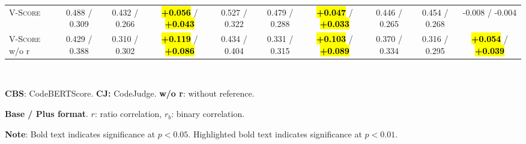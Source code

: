 \begin{table}[t]
\begin{tabular}{@{}
        l|ccc|ccc|ccc@{}}
        \midrule
        \textsc{V-Score}        & 0.488 / 0.309   & 0.432 / 0.266   & \hl{\textbf{+0.056}} / \hl{\textbf{+0.043}} & 0.527 / 0.322   & 0.479 / 0.288   & \hl{\textbf{+0.047}} / \hl{\textbf{+0.033}} & 0.446 / 0.265   & 0.454 / 0.268   & -0.008 / -0.004                     \\
        \textsc{V-Score} w/o r  & 0.429 / 0.388   & 0.310 / 0.302   & \hl{\textbf{+0.119}} / \hl{\textbf{+0.086}} & 0.434 / 0.404   & 0.331 / 0.315   & \hl{\textbf{+0.103}} / \hl{\textbf{+0.089}} & 0.370 / 0.334   & 0.316 / 0.295   & \hl{\textbf{+0.054}} / \hl{\textbf{+0.039}} \\
        \bottomrule
    \end{tabular}\\
    \begin{description}[itemsep=-3pt,topsep=0pt]
        \item \textbf{CBS}: CodeBERTScore. \hspace{10pt}  \textbf{CJ:} CodeJudge. \hspace{10pt} \textbf{w/o r}: without reference.
        \item \textbf{Base / Plus format}. $r$: ratio correlation, $r_b$: binary correlation.
        \item \textbf{Note}: Bold text indicates significance at $p < 0.05$. Highlighted bold text indicates significance at $p < 0.01$.
    \end{description}
\end{table}